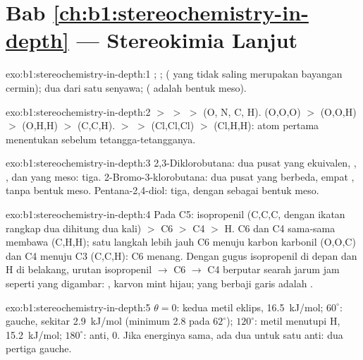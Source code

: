 \section*{Bab \ref{ch:b1:stereochemistry-in-depth} --- Stereokimia Lanjut}

\begin{solution}{exo:b1:stereochemistry-in-depth:1}
; ;  ( yang tidak saling
merupakan bayangan cermin); dua  dari satu senyawa;
 ( adalah bentuk meso).
\end{solution}

\begin{solution}{exo:b1:stereochemistry-in-depth:2}
 $>$  $>$  $>$  (O, N, C, H).
 (O,O,O) $>$  (O,O,H) $>$  (O,H,H) $>$
 (C,C,H).  $>$  $>$  (Cl,Cl,Cl)
$>$  (Cl,H,H): atom pertama menentukan sebelum tetangga-tetangganya.
\end{solution}

\begin{solution}{exo:b1:stereochemistry-in-depth:3}
2,3-Diklorobutana: dua pusat yang ekuivalen, , , dan
 yang meso: tiga. 2-Bromo-3-klorobutana: dua pusat yang
berbeda, empat , tanpa bentuk meso. Pentana-2,4-diol: tiga,
dengan  sebagai bentuk meso.
\end{solution}

\begin{solution}{exo:b1:stereochemistry-in-depth:4}
Pada C5: isopropenil (C,C,C, dengan ikatan rangkap dua dihitung dua
kali) $>$ C6 $>$ C4 $>$ H. C6 dan C4 sama-sama membawa (C,H,H); satu
langkah lebih jauh C6 menuju karbon karbonil (O,O,C) dan C4 menuju C3
(C,C,H): C6 menang. Dengan gugus isopropenil di depan dan H di belakang,
urutan isopropenil $\to$ C6 $\to$ C4 berputar searah jarum jam seperti
yang digambar: , karvon mint hijau; yang berbaji garis adalah
.
\end{solution}

\begin{solution}{exo:b1:stereochemistry-in-depth:5}
$\theta = 0$: kedua metil eklips, \qty{16.5}{kJ/mol}; $60^\circ$: gauche,
sekitar \qty{2.9}{kJ/mol} (minimum 2.8 pada $62^\circ$); $120^\circ$:
metil menutupi H, \qty{15.2}{kJ/mol}; $180^\circ$: anti, 0. Jika
energinya sama, ada dua  untuk satu anti: dua pertiga
gauche.
\end{solution}

